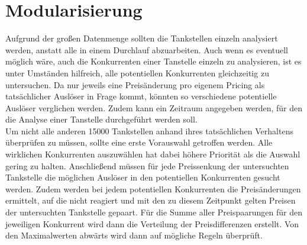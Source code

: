 \section{Modularisierung}
Aufgrund der großen Datenmenge sollten die Tankstellen einzeln analysiert werden, anstatt alle in einem Durchlauf abzuarbeiten. Auch wenn es eventuell möglich wäre, auch die Konkurrenten einer Tanstelle einzeln zu analysieren, ist es unter Umständen hilfreich, alle potentiellen Konkurrenten gleichzeitig zu untersuchen. Da nur jeweils eine Preisänderung pro eigenem Pricing als tatsächlicher Auslöser in Frage kommt, könnten so verschiedene potentielle Auslöser verglichen werden.
Zudem kann ein Zeitraum angegeben werden, für den die Analyse einer Tanstelle durchgeführt werden soll.\\
Um nicht alle anderen 15000 Tankstellen anhand ihres tatsächlichen Verhaltens überprüfen zu müssen, sollte eine erste Vorauswahl getroffen werden. Alle wirklichen Konkurrenten auszuwählen hat dabei höhere Priorität als die Auswahl gering zu halten. Anschließend müssen für jede Preissenkung der untersuchten Tankstelle die möglichen Auslöser in den potentiellen Konkurrenten gesucht werden. Zudem werden bei jedem potentiellen Konkurrenten die Preisänderungen ermittelt, auf die nicht reagiert und mit den zu diesem Zeitpunkt gelten Preisen der untersuchten Tankstelle gepaart. Für die Summe aller Preispaarungen für den jeweiligen Konkurrent wird dann die Verteilung der Preisdifferenzen erstellt. Von den Maximalwerten abwärts wird dann auf mögliche Regeln überprüft.
